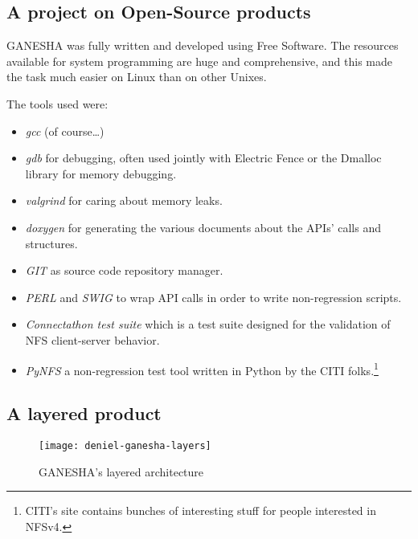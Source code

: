 \documentclass[final]{ols}
\begin{document}
\subsection{A project on Open-Source products}
GANESHA was fully written and developed using Free Software. The
resources available for system programming are huge and comprehensive,
and this made the task much easier on Linux than on other Unixes.

The tools used were:
\begin{itemize}
\item \textit{gcc} (of course\ldots)
\item \textit{gdb} for debugging, often used jointly with Electric Fence
  or the Dmalloc library for memory debugging.
\item \textit{valgrind} for caring about memory leaks.
\item \textit{doxygen} for generating the various documents about the
  APIs' calls and structures.
\item \textit{GIT} as source code repository manager.
\item \textit{PERL} and \textit{SWIG} to wrap API calls in order to write
  non-regression scripts.
\item \textit{Connectathon test suite} which is a test suite designed for
  the validation of NFS client-server behavior.
\item \textit{PyNFS} a non-regression test tool written in Python by the
  CITI folks.\footnote{CITI's site contains bunches of interesting
    stuff for people interested in NFSv4.}
\end{itemize}

\subsection{A layered product}

\begin{figure}
\centering
\texttt{[image: deniel-ganesha-layers]}
\caption{GANESHA's layered architecture}
\end{figure}
\end{document}
